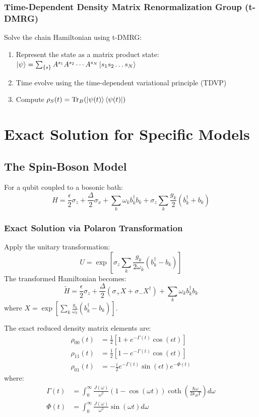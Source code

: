 \documentclass[12pt]{article}
\begin{document}
\subsubsection{Time-Dependent Density Matrix Renormalization Group (t-DMRG)}
Solve the chain Hamiltonian using t-DMRG:
\begin{enumerate}
    \item Represent the state as a matrix product state: $\ket{\psi} = \sum_{\{s\}} A^{s_1} A^{s_2} \cdots A^{s_N} \ket{s_1 s_2 \ldots s_N}$
    \item Time evolve using the time-dependent variational principle (TDVP)
    \item Compute $\rho_S(t) = \text{Tr}_B(\ket{\psi(t)}\bra{\psi(t)})$
\end{enumerate}

\section{Exact Solution for Specific Models}

\subsection{The Spin-Boson Model}

For a qubit coupled to a bosonic bath:
\[
H = \frac{\epsilon}{2} \sigma_z + \frac{\Delta}{2} \sigma_x + \sum_k \omega_k b_k^\dagger b_k + \sigma_z \sum_k \frac{g_k}{2} (b_k^\dagger + b_k)
\]

\subsubsection{Exact Solution via Polaron Transformation}
Apply the unitary transformation:
\[
U = \exp\left[ \sigma_z \sum_k \frac{g_k}{2\omega_k} (b_k^\dagger - b_k) \right]
\]
The transformed Hamiltonian becomes:
\[
\tilde{H} = \frac{\epsilon}{2} \sigma_z + \frac{\Delta}{2} (\sigma_+ X + \sigma_- X^\dagger) + \sum_k \omega_k b_k^\dagger b_k
\]
where $X = \exp\left[ \sum_k \frac{g_k}{\omega_k} (b_k^\dagger - b_k) \right]$.

The exact reduced density matrix elements are:
\begin{align}
\rho_{00}(t) &= \frac{1}{2} \left[ 1 + e^{-\Gamma(t)} \cos(\epsilon t) \right] \\
\rho_{11}(t) &= \frac{1}{2} \left[ 1 - e^{-\Gamma(t)} \cos(\epsilon t) \right] \\
\rho_{01}(t) &= -\frac{i}{2} e^{-\Gamma(t)} \sin(\epsilon t) e^{-\Phi(t)}
\end{align}
where:
\begin{align}
\Gamma(t) &= \int_0^\infty \frac{J(\omega)}{\omega^2} (1 - \cos(\omega t)) \coth\left(\frac{\hbar\omega}{2k_B T}\right) d\omega \\
\Phi(t) &= \int_0^\infty \frac{J(\omega)}{\omega^2} \sin(\omega t) d\omega
\end{align}
\end{document}
